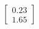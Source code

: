 \documentclass[preview]{standalone}
\begin{document}
\begin{align*}
\begin{bmatrix} 0.23 \\ 1.65 \end{bmatrix}
\end{align*}
\end{document}
